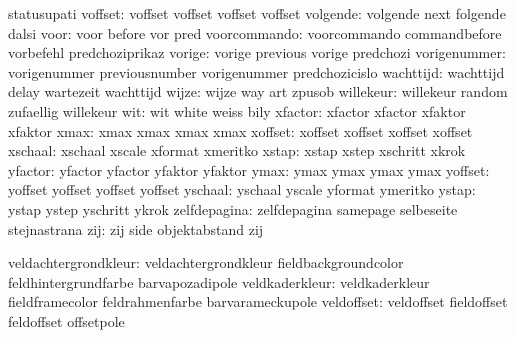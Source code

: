                        statusupati
             voffset:  voffset              voffset              voffset
                       voffset
            volgende:  volgende             next                 folgende
                       dalsi
                voor:  voor                 before               vor
                       pred
        voorcommando:  voorcommando         commandbefore        vorbefehl
                       predchoziprikaz
              vorige:  vorige               previous             vorige
                       predchozi
        vorigenummer:  vorigenummer         previousnumber       vorigenummer
                       predchozicislo
           wachttijd:  wachttijd            delay                wartezeit
                       wachttijd %
               wijze:  wijze                way                  art
                       zpusob
           willekeur:  willekeur            random               zufaellig
                       willekeur %
                 wit:  wit                  white                weiss
                       bily
             xfactor:  xfactor              xfactor              xfaktor
                       xfaktor
                xmax:  xmax                 xmax                 xmax
                       xmax
             xoffset:  xoffset              xoffset              xoffset
                       xoffset
             xschaal:  xschaal              xscale               xformat
                       xmeritko
               xstap:  xstap                xstep                xschritt
                       xkrok
             yfactor:  yfactor              yfactor              yfaktor
                       yfaktor
                ymax:  ymax                 ymax                 ymax
                       ymax
             yoffset:  yoffset              yoffset              yoffset
                       yoffset
             yschaal:  yschaal              yscale               yformat
                       ymeritko
               ystap:  ystap                ystep                yschritt
                       ykrok
        zelfdepagina:  zelfdepagina         samepage             selbeseite
                       stejnastrana
                 zij:  zij                  side                 objektabstand
                       zij %

veldachtergrondkleur:  veldachtergrondkleur fieldbackgroundcolor feldhintergrundfarbe
                       barvapozadipole
      veldkaderkleur:  veldkaderkleur       fieldframecolor      feldrahmenfarbe
                       barvarameckupole
          veldoffset:  veldoffset           fieldoffset          feldoffset
                       offsetpole

